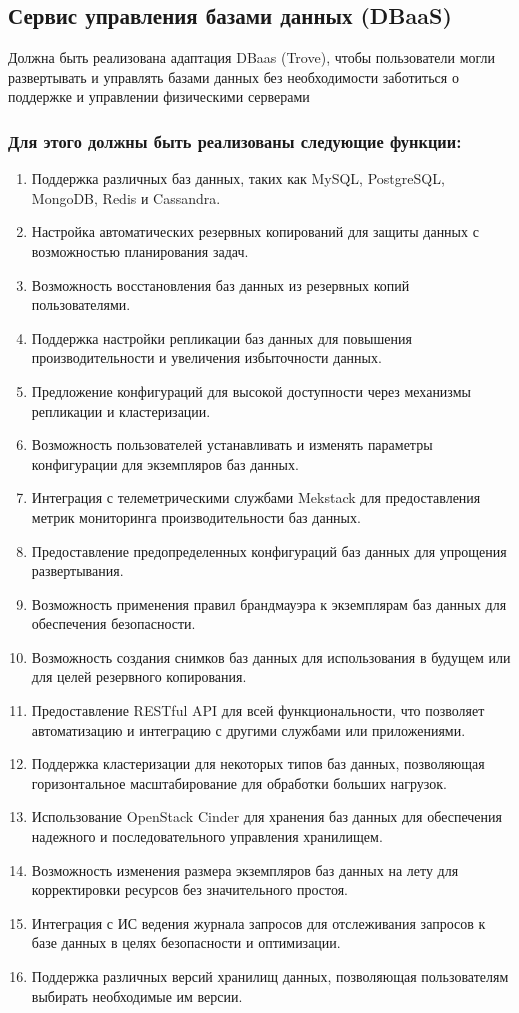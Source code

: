 \documentclass[14pt, a4paper]{extarticle}
\begin{document}
\subsection{Сервис управления базами данных (DBaaS)}

Должна быть реализована адаптация DBaas (Trove), чтобы пользователи могли развертывать и управлять базами данных без необходимости заботиться о поддержке и управлении физическими серверами

\subsubsection*{Для этого должны быть реализованы следующие функции:}

\begin{enumerate}
\item Поддержка различных баз данных, таких как MySQL, PostgreSQL, MongoDB, Redis и Cassandra.
\item Настройка автоматических резервных копирований для защиты данных с возможностью планирования задач.
\item Возможность восстановления баз данных из резервных копий пользователями.
\item Поддержка настройки репликации баз данных для повышения производительности и увеличения избыточности данных.
\item Предложение конфигураций для высокой доступности через механизмы репликации и кластеризации.
\item Возможность пользователей устанавливать и изменять параметры конфигурации для экземпляров баз данных.
\item Интеграция с телеметрическими службами Mekstack для предоставления метрик мониторинга производительности баз данных.
\item Предоставление предопределенных конфигураций баз данных для упрощения развертывания.
\item Возможность применения правил брандмауэра к экземплярам баз данных для обеспечения безопасности.
\item Возможность создания снимков баз данных для использования в будущем или для целей резервного копирования.
\item Предоставление RESTful API для всей функциональности, что позволяет автоматизацию и интеграцию с другими службами или приложениями.
\item Поддержка кластеризации для некоторых типов баз данных, позволяющая горизонтальное масштабирование для обработки больших нагрузок.
\item Использование OpenStack Cinder для хранения баз данных для обеспечения надежного и последовательного управления хранилищем.
\item Возможность изменения размера экземпляров баз данных на лету для корректировки ресурсов без значительного простоя.
\item Интеграция с ИС ведения журнала запросов для отслеживания запросов к базе данных в целях безопасности и оптимизации.
\item Поддержка различных версий хранилищ данных, позволяющая пользователям выбирать необходимые им версии.
\end{enumerate}
\end{document}
